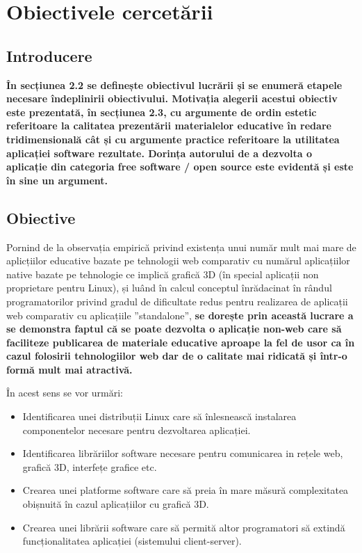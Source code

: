 \chapter{Obiectivele cercetării}
\section{Introducere}
\par \textbf{În secțiunea 2.2 se definește obiectivul lucrării și se enumeră etapele necesare îndeplinirii obiectivului. Motivația alegerii acestui obiectiv este prezentată, în secțiunea 2.3, cu argumente de ordin estetic referitoare la calitatea prezentării materialelor educative în redare tridimensională cât și cu argumente practice referitoare la utilitatea aplicației software rezultate. Dorința autorului de a dezvolta o aplicație din categoria free software / open source este evidentă și este în sine un argument.  }
\section{Obiective}
\par Pornind de la observația empirică privind existența unui număr mult mai mare de aplicțiilor educative bazate pe tehnologii web comparativ cu numărul aplicațiilor native bazate pe tehnologie ce implică grafică 3D (în special aplicații non proprietare pentru Linux), și luând în calcul conceptul înrădacinat în rândul programatorilor privind gradul de dificultate redus pentru realizarea de aplicații web comparativ cu aplicațiile ”standalone”, \textbf{ se dorește prin această lucrare a se demonstra faptul că se poate dezvolta o aplicație non-web care să faciliteze publicarea de materiale educative aproape la fel de usor ca în cazul folosirii tehnologiilor web dar de o calitate mai ridicată și într-o formă mult mai atractivă.}
\\
\par În acest sens se vor urmări:
\begin{itemize}
\item Identificarea unei distribuții Linux care să înlesnească instalarea componentelor necesare pentru dezvoltarea aplicației.
\item Identificarea librăriilor software necesare pentru comunicarea in rețele web, grafică 3D, interfețe grafice etc.
\item Crearea unei platforme software care să preia în mare măsură complexitatea obișnuită în cazul aplicațiilor cu grafică 3D.
\item Crearea unei librării software care să permită altor programatori să extindă funcționalitatea aplicației (sistemului client-server).
\end{itemize}

